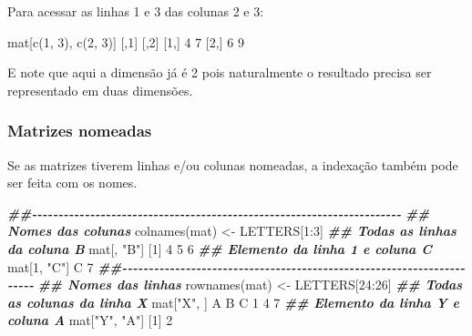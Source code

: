 \documentclass[
  10pt,
  a4paper]{book}
\newenvironment{Shaded}{\begin{snugshade}}{\end{snugshade}}
\newcommand{\DecValTok}[1]{\textcolor[rgb]{0.00,0.00,0.81}{#1}}
\newcommand{\DocumentationTok}[1]{\textcolor[rgb]{0.56,0.35,0.01}{\textbf{\textit{#1}}}}
\newcommand{\FunctionTok}[1]{\textcolor[rgb]{0.00,0.00,0.00}{#1}}
\newcommand{\NormalTok}[1]{#1}
\newcommand{\OtherTok}[1]{\textcolor[rgb]{0.56,0.35,0.01}{#1}}
\newcommand{\SpecialCharTok}[1]{\textcolor[rgb]{0.00,0.00,0.00}{#1}}
\newcommand{\StringTok}[1]{\textcolor[rgb]{0.31,0.60,0.02}{#1}}
\begin{document}
Para acessar as linhas 1 e 3 das colunas 2 e 3:

\begin{Shaded}
\begin{Highlighting}[]
\NormalTok{mat[}\FunctionTok{c}\NormalTok{(}\DecValTok{1}\NormalTok{, }\DecValTok{3}\NormalTok{), }\FunctionTok{c}\NormalTok{(}\DecValTok{2}\NormalTok{, }\DecValTok{3}\NormalTok{)]}
\NormalTok{     [,}\DecValTok{1}\NormalTok{] [,}\DecValTok{2}\NormalTok{]}
\NormalTok{[}\DecValTok{1}\NormalTok{,]    }\DecValTok{4}    \DecValTok{7}
\NormalTok{[}\DecValTok{2}\NormalTok{,]    }\DecValTok{6}    \DecValTok{9}
\end{Highlighting}
\end{Shaded}

E note que aqui a dimensão já é 2 pois naturalmente o resultado precisa
ser representado em duas dimensões.

\hypertarget{matrizes-nomeadas}{%
\subsubsection{Matrizes nomeadas}\label{matrizes-nomeadas}}

Se as matrizes tiverem linhas e/ou colunas nomeadas, a indexação também
pode ser feita com os nomes.

\begin{Shaded}
\begin{Highlighting}[]
\DocumentationTok{\#\#{-}{-}{-}{-}{-}{-}{-}{-}{-}{-}{-}{-}{-}{-}{-}{-}{-}{-}{-}{-}{-}{-}{-}{-}{-}{-}{-}{-}{-}{-}{-}{-}{-}{-}{-}{-}{-}{-}{-}{-}{-}{-}{-}{-}{-}{-}{-}{-}{-}{-}{-}{-}{-}{-}{-}{-}{-}{-}{-}{-}{-}{-}{-}{-}{-}{-}{-}{-}{-}{-}}
\DocumentationTok{\#\# Nomes das colunas}
\FunctionTok{colnames}\NormalTok{(mat) }\OtherTok{\textless{}{-}}\NormalTok{ LETTERS[}\DecValTok{1}\SpecialCharTok{:}\DecValTok{3}\NormalTok{]}
\DocumentationTok{\#\# Todas as linhas da coluna B}
\NormalTok{mat[, }\StringTok{"B"}\NormalTok{]}
\NormalTok{[}\DecValTok{1}\NormalTok{] }\DecValTok{4} \DecValTok{5} \DecValTok{6}
\DocumentationTok{\#\# Elemento da linha 1 e coluna C}
\NormalTok{mat[}\DecValTok{1}\NormalTok{, }\StringTok{"C"}\NormalTok{]}
\NormalTok{C }
\DecValTok{7} 
\DocumentationTok{\#\#{-}{-}{-}{-}{-}{-}{-}{-}{-}{-}{-}{-}{-}{-}{-}{-}{-}{-}{-}{-}{-}{-}{-}{-}{-}{-}{-}{-}{-}{-}{-}{-}{-}{-}{-}{-}{-}{-}{-}{-}{-}{-}{-}{-}{-}{-}{-}{-}{-}{-}{-}{-}{-}{-}{-}{-}{-}{-}{-}{-}{-}{-}{-}{-}{-}{-}{-}{-}{-}{-}}
\DocumentationTok{\#\# Nomes das linhas}
\FunctionTok{rownames}\NormalTok{(mat) }\OtherTok{\textless{}{-}}\NormalTok{ LETTERS[}\DecValTok{24}\SpecialCharTok{:}\DecValTok{26}\NormalTok{]}
\DocumentationTok{\#\# Todas as colunas da linha X}
\NormalTok{mat[}\StringTok{"X"}\NormalTok{, ]}
\NormalTok{A B C }
\DecValTok{1} \DecValTok{4} \DecValTok{7} 
\DocumentationTok{\#\# Elemento da linha Y e coluna A}
\NormalTok{mat[}\StringTok{"Y"}\NormalTok{, }\StringTok{"A"}\NormalTok{]}
\NormalTok{[}\DecValTok{1}\NormalTok{] }\DecValTok{2}
\end{Highlighting}
\end{Shaded}
\end{document}
